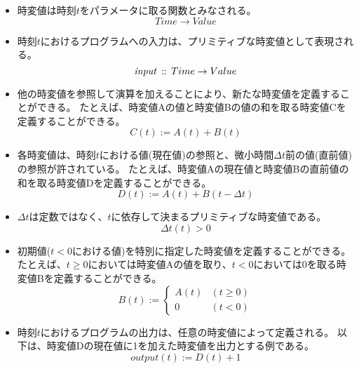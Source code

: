 \begin{itemize}
  \item
  時変値は時刻$t$をパラメータに取る関数とみなされる。
  \begin{equation*}
    Time \rightarrow Value
  \end{equation*}

  \item
  時刻$t$におけるプログラムへの入力は、プリミティブな時変値として表現される。
  \begin{equation*}
    {\it input} \, :: \, Time \rightarrow Value
  \end{equation*}

  \item
  他の時変値を参照して演算を加えることにより、新たな時変値を定義することができる。
  たとえば、時変値Aの値と時変値Bの値の和を取る時変値Cを定義することができる。
  \begin{equation*}
    C(t) := A(t) + B(t)
  \end{equation*}

  \item
  各時変値は、時刻$t$における値(現在値)の参照と、微小時間$ \Delta t $前の値(直前値)の参照が許されている。
  たとえば、時変値Aの現在値と時変値Bの直前値の和を取る時変値Dを定義することができる。
  \begin{equation*}
    D(t) := A(t) + B(t - \Delta t)
  \end{equation*}

  \item
  $ \Delta t $は定数ではなく、$t$に依存して決まるプリミティブな時変値である。
  \begin{equation*}
    \Delta t(t) > 0
  \end{equation*}

  \item
  初期値($ t < 0 $における値)を特別に指定した時変値を定義することができる。
  たとえば、$t \geq 0$においては時変値Aの値を取り、$t < 0$においては0を取る時変値Bを定義することができる。
  \begin{equation*}
    B(t) := \begin{cases}
      A(t) & (t \geq 0) \\
      0 & (t < 0)
    \end{cases}
  \end{equation*}

  \item
  時刻$t$におけるプログラムの出力は、任意の時変値によって定義される。
  以下は、時変値Dの現在値に1を加えた時変値を出力とする例である。
  \begin{equation*}
    output(t) := D(t) + 1
  \end{equation*}
\end{itemize}

